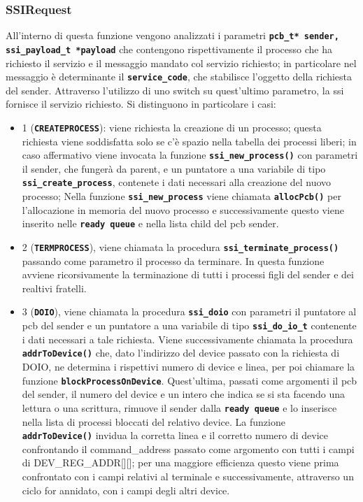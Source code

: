 \documentclass{article}
\begin{document}
	\subsubsection{SSIRequest}
	All'interno di questa funzione vengono analizzati i parametri \texttt{\textbf{pcb\_t*
	sender, ssi\_payload\_t *payload}} che contengono rispettivamente il processo che
	ha richiesto il servizio e il messaggio mandato col servizio richiesto; in
	particolare nel messaggio è determinante il \texttt{\textbf{service\_code}},
	che stabilisce l'oggetto della richiesta del sender. Attraverso l'utilizzo di uno
	switch su quest'ultimo parametro, la ssi fornisce il servizio richiesto. Si distinguono
	in particolare i casi:
	\begin{itemize}
		\item 1 (\texttt{\textbf{CREATEPROCESS}}): viene richiesta la creazione di un
			processo; questa richiesta viene soddisfatta solo se c'è spazio nella
			tabella dei processi liberi; in caso affermativo viene invocata la funzione
			\texttt{\textbf{ssi\_new\_process()}} con parametri il sender, che fungerà
			da parent, e un puntatore a una variabile di tipo \texttt{\textbf{ssi\_create\_process}},
			contenete i dati necessari alla creazione del nuovo processo; Nella funzione
			\texttt{\textbf{ssi\_new\_process}} viene chiamata \texttt{\textbf{allocPcb()}}
			per l'allocazione in memoria del nuovo processo e successivamente questo viene
			inserito nelle \texttt{\textbf{ready queue}} e nella lista child del pcb
			sender.

		\item 2 (\texttt{\textbf{TERMPROCESS}}), viene chiamata la procedura \texttt{\textbf{ssi\_terminate\_process()}}
			passando come parametro il processo da terminare. In questa funzione avviene
			ricorsivamente la terminazione di tutti i processi figli del sender e dei realtivi
			fratelli.

		\item 3 (\texttt{\textbf{DOIO}}), viene chiamata la procedura \texttt{\textbf{ssi\_doio}}
			con parametri il puntatore al pcb del sender e un puntatore a una
			variabile di tipo \texttt{\textbf{ssi\_do\_io\_t}} contenente i dati necessari
			a tale richiesta. Viene successivamente chiamata la procedura \texttt{\textbf{addrToDevice()}}
			che, dato l'indirizzo del device passato con la richiesta di DOIO, ne determina
			i rispettivi numero di device e linea, per poi chiamare la funzione
			\texttt{\textbf{blockProcessOnDevice}}. Quest'ultima, passati come argomenti
			il pcb del sender, il numero del device e un intero che indica se si sta
			facendo una lettura o una scrittura, rimuove il sender dalla \texttt{\textbf{ready
			queue}} e lo inserisce nella lista di processi bloccati del relativo
			device. La funzione \texttt{\textbf{addrToDevice()}} invidua la corretta
			linea e il corretto numero di device confrontando il command\_address
			passato come argomento con tutti i campi di DEV\_REG\_ADDR[][]; per una maggiore
			efficienza questo viene prima confrontato con i campi relativi al terminale
			e successivamente, attraverso un ciclo for annidato, con i campi degli altri
			device.


\end{itemize}
\end{document}
